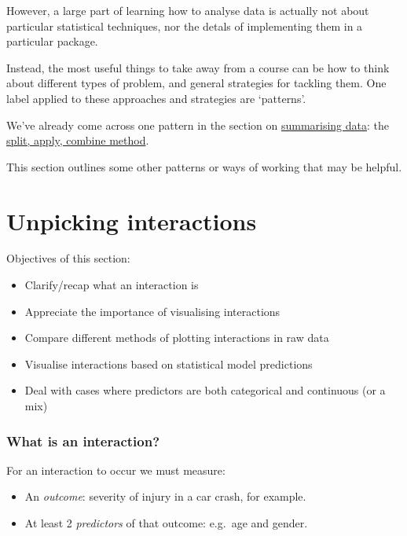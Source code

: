 \documentclass[]{article}
\providecommand{\tightlist}{%
  \setlength{\itemsep}{0pt}\setlength{\parskip}{0pt}}
\theoremstyle{definition}
\theoremstyle{definition}
\theoremstyle{definition}
\theoremstyle{remark}
\begin{document}
However, a large part of learning how to analyse data is actually not
about particular statistical techniques, nor the detals of implementing
them in a particular package.

Instead, the most useful things to take away from a course can be how to
think about different types of problem, and general strategies for
tackling them. One label applied to these approaches and strategies are
`patterns'.

We've already come across one pattern in the section on
\href{summarising-data}{summarising data}: the
\protect\hyperlink{split-apply-combine}{split, apply, combine method}.

This section outlines some other patterns or ways of working that may be
helpful.

\hypertarget{understanding-interactions}{\section{Unpicking
interactions}\label{understanding-interactions}}

Objectives of this section:

\begin{itemize}
\item
  Clarify/recap what an interaction is
\item
  Appreciate the importance of visualising interactions
\item
  Compare different methods of plotting interactions in raw data
\item
  Visualise interactions based on statistical model predictions
\item
  Deal with cases where predictors are both categorical and continuous
  (or a mix)
\end{itemize}

\subsubsection*{What is an interaction?}\label{what-is-an-interaction}

For an interaction to occur we must measure:

\begin{itemize}
\tightlist
\item
  An \emph{outcome}: severity of injury in a car crash, for example.
\item
  At least 2 \emph{predictors} of that outcome: e.g.~age and gender.
\end{itemize}
\end{document}
